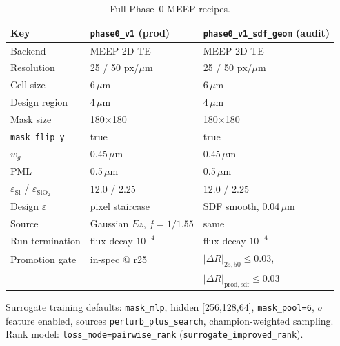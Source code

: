 \documentclass[11pt,a4paper]{article}
\begin{document}
\begin{table}[h]
  \centering
  \caption{Full Phase~0 MEEP recipes.}
  \label{tab:full-recipe}
  \small
  \begin{tabular}{lll}
    \toprule
    Key & \texttt{phase0\_v1} (prod) & \texttt{phase0\_v1\_sdf\_geom} (audit) \\
    \midrule
    Backend & MEEP 2D TE & MEEP 2D TE \\
    Resolution & 25 / 50 px/$\mu$m & 25 / 50 px/$\mu$m \\
    Cell size & 6\,$\mu$m & 6\,$\mu$m \\
    Design region & 4\,$\mu$m & 4\,$\mu$m \\
    Mask size & 180$\times$180 & 180$\times$180 \\
    \texttt{mask\_flip\_y} & true & true \\
    $w_g$ & 0.45\,$\mu$m & 0.45\,$\mu$m \\
    PML & 0.5\,$\mu$m & 0.5\,$\mu$m \\
    $\varepsilon_{\mathrm{Si}}$ / $\varepsilon_{\mathrm{SiO}_2}$ & 12.0 / 2.25 & 12.0 / 2.25 \\
    Design $\varepsilon$ & pixel staircase & SDF smooth, 0.04\,$\mu$m \\
    Source & Gaussian $Ez$, $f=1/1.55$ & same \\
    Run termination & flux decay $10^{-4}$ & flux decay $10^{-4}$ \\
    Promotion gate & in-spec @ r25 & $|{\Delta}R|_{25,50}\le 0.03$, \\
    & & $|{\Delta}R|_{\mathrm{prod,sdf}}\le 0.03$ \\
    \bottomrule
  \end{tabular}
\end{table}

Surrogate training defaults: \texttt{mask\_mlp}, hidden [256,128,64], \texttt{mask\_pool=6}, $\sigma$ feature enabled, sources \texttt{perturb\_plus\_search}, champion-weighted sampling.
Rank model: \texttt{loss\_mode=pairwise\_rank} (\texttt{surrogate\_improved\_rank}).



\end{document}
